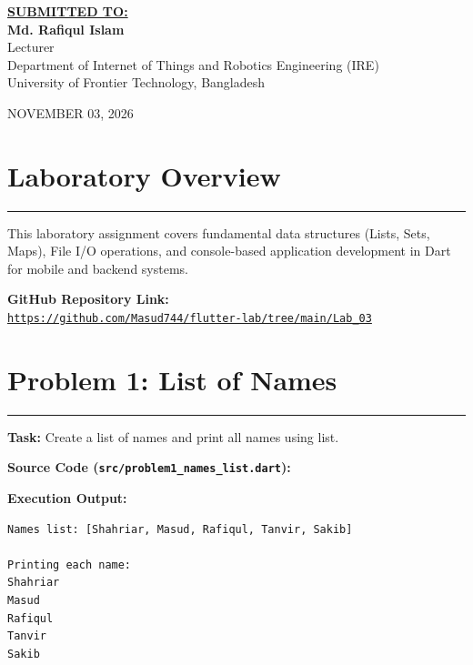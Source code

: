 \documentclass[11pt,a4paper]{article}
\begin{document}
\begin{titlepage}
    {\small \textbf{\underline{SUBMITTED TO:}}}\\[0.2cm]
    {\large \textbf{Md. Rafiqul Islam}}\\[0.12cm]
    {\small Lecturer}\\[0.08cm]
    {\footnotesize Department of Internet of Things and Robotics Engineering (IRE)}\\[0.06cm]
    {\footnotesize University of Frontier Technology, Bangladesh}

    \vfill
    {\footnotesize NOVEMBER 03, 2026}
    \vspace*{0.25cm}
\end{titlepage}

\newpage
{}

\section*{Laboratory Overview}
\noindent\rule{\textwidth}{0.5pt}\vspace{0.1cm}
This laboratory assignment covers fundamental data structures (Lists, Sets, Maps), File I/O operations, and console-based application development in Dart for mobile and backend systems.

\vspace{0.2cm}
\noindent\textbf{GitHub Repository Link:}\\
\href{https://github.com/Masud744/flutter-lab/tree/main/Lab_03}{\texttt{https://github.com/Masud744/flutter-lab/tree/main/Lab\_03}}

\vspace{0.3cm}
\section*{Problem 1: List of Names}
\noindent\rule{\textwidth}{0.4pt}\vspace{0.08cm}
\textbf{Task:} Create a list of names and print all names using list.

\vspace{0.1cm}
\textbf{Source Code (\texttt{src/problem1\_names\_list.dart}):}


\textbf{Execution Output:}
\begin{lstlisting}[style=outputstyle]
Names list: [Shahriar, Masud, Rafiqul, Tanvir, Sakib]

Printing each name:
Shahriar
Masud
Rafiqul
Tanvir
Sakib
\end{lstlisting}
\end{document}
